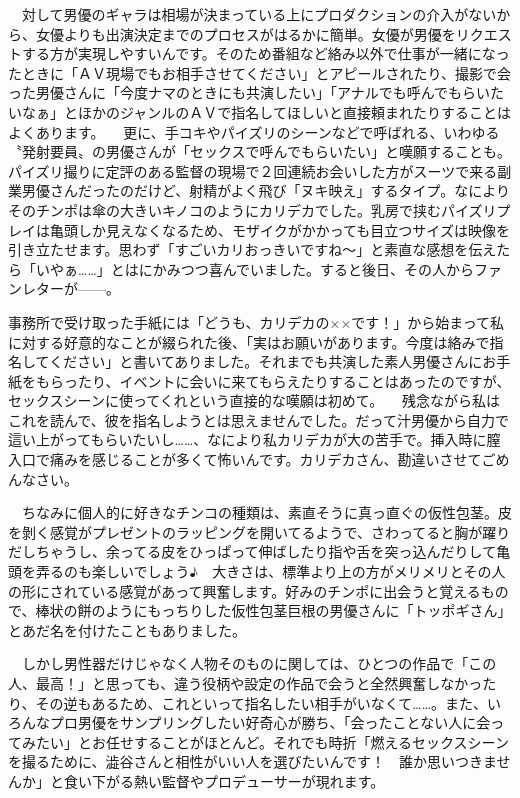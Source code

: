 \documentclass[12pt,UTF8]{ctexbook}
\begin{document}
　対して男優のギャラは相場が決まっている上にプロダクションの介入がないから、女優よりも出演決定までのプロセスがはるかに簡単。女優が男優をリクエストする方が実現しやすいんです。そのため番組など絡み以外で仕事が一緒になったときに「ＡＶ現場でもお相手させてください」とアピールされたり、撮影で会った男優さんに「今度ナマのときにも共演したい」「アナルでも呼んでもらいたいなぁ」とほかのジャンルのＡＶで指名してほしいと直接頼まれたりすることはよくあります。
　更に、手コキやパイズリのシーンなどで呼ばれる、いわゆる〝発射要員〟の男優さんが「セックスで呼んでもらいたい」と嘆願することも。パイズリ撮りに定評のある監督の現場で２回連続お会いした方がスーツで来る副業男優さんだったのだけど、射精がよく飛び「ヌキ映え」するタイプ。なによりそのチンポは傘の大きいキノコのようにカリデカでした。乳房で挟むパイズリプレイは亀頭しか見えなくなるため、モザイクがかかっても目立つサイズは映像を引き立たせます。思わず「すごいカリおっきいですね〜」と素直な感想を伝えたら「いやぁ……」とはにかみつつ喜んでいました。すると後日、その人からファンレターが——。

事務所で受け取った手紙には「どうも、カリデカの××です！」から始まって私に対する好意的なことが綴られた後、「実はお願いがあります。今度は絡みで指名してください」と書いてありました。それまでも共演した素人男優さんにお手紙をもらったり、イベントに会いに来てもらえたりすることはあったのですが、セックスシーンに使ってくれという直接的な嘆願は初めて。
　残念ながら私はこれを読んで、彼を指名しようとは思えませんでした。だって汁男優から自力で這い上がってもらいたいし……、なにより私カリデカが大の苦手で。挿入時に膣入口で痛みを感じることが多くて怖いんです。カリデカさん、勘違いさせてごめんなさい。

　ちなみに個人的に好きなチンコの種類は、素直そうに真っ直ぐの仮性包茎。皮を剝く感覚がプレゼントのラッピングを開いてるようで、さわってると胸が躍りだしちゃうし、余ってる皮をひっぱって伸ばしたり指や舌を突っ込んだりして亀頭を弄るのも楽しいでしょう♪　大きさは、標準より上の方がメリメリとその人の形にされている感覚があって興奮します。好みのチンポに出会うと覚えるもので、棒状の餅のようにもっちりした仮性包茎巨根の男優さんに「トッポギさん」とあだ名を付けたこともありました。

　しかし男性器だけじゃなく人物そのものに関しては、ひとつの作品で「この人、最高！」と思っても、違う役柄や設定の作品で会うと全然興奮しなかったり、その逆もあるため、これといって指名したい相手がいなくて……。また、いろんなプロ男優をサンプリングしたい好奇心が勝ち、「会ったことない人に会ってみたい」とお任せすることがほとんど。それでも時折「燃えるセックスシーンを撮るために、澁谷さんと相性がいい人を選びたいんです！　誰か思いつきませんか」と食い下がる熱い監督やプロデューサーが現れます。
\end{document}
